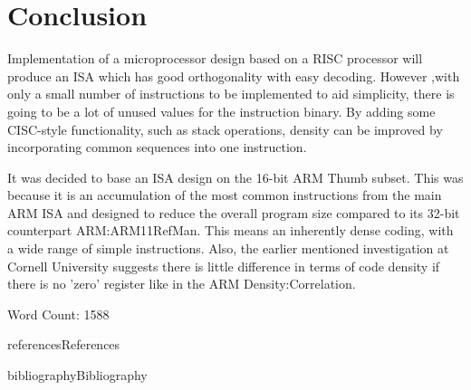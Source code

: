 \documentclass[12pt,a4paper]{article}
\begin{document}
\section{Conclusion}
Implementation of a microprocessor design based on a RISC processor will produce an ISA which has good orthogonality with easy decoding. However ,with only a small number of instructions to be implemented to aid simplicity, there is going to be a lot of unused values for the instruction binary. By adding some CISC-style functionality, such as stack operations, density can be improved by incorporating common sequences into one instruction.

It was decided to base an ISA design on the 16-bit ARM Thumb subset. This was because it is an accumulation of the most common instructions from the main ARM ISA and designed to reduce the overall program size compared to its 32-bit counterpart \cite{ref}{ARM:ARM11RefMan}. This means an inherently dense coding, with a wide range of simple instructions. Also, the earlier mentioned investigation at Cornell University suggests there is little difference in terms of code density if there is no 'zero' register like in the ARM \cite{ref}{Density:Correlation}.

\vspace*{\baselineskip}
Word Count: 1588%

\newpage
{references}{References}

\newpage
\makeatletter 
	\renewcommand\@biblabel[1]{\textbullet}
\makeatother
{bibliography}{Bibliography}
\end{document}
